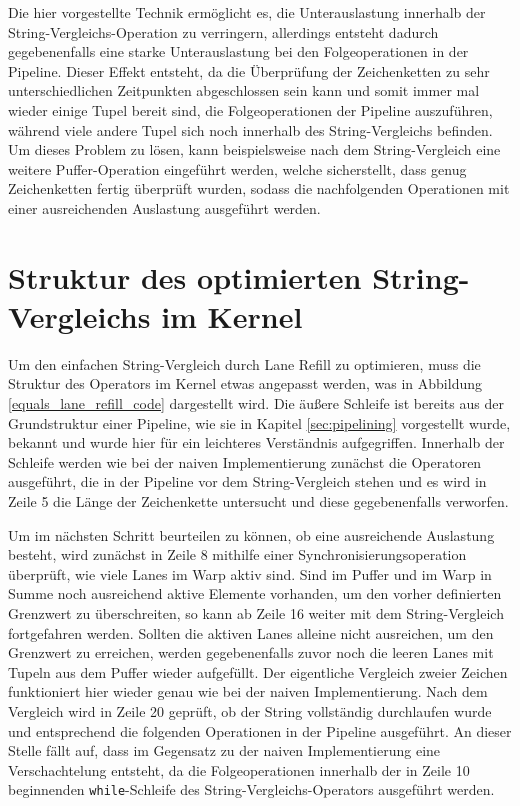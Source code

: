 Die hier vorgestellte Technik ermöglicht es, die Unterauslastung innerhalb der String-Vergleichs-Operation zu verringern, allerdings entsteht dadurch gegebenenfalls eine starke Unterauslastung bei den Folgeoperationen in der Pipeline.
Dieser Effekt entsteht, da die Überprüfung der Zeichenketten zu sehr unterschiedlichen Zeitpunkten abgeschlossen sein kann und somit immer mal wieder einige Tupel bereit sind, die Folgeoperationen der Pipeline auszuführen, während viele andere Tupel sich noch innerhalb des String-Vergleichs befinden.
Um dieses Problem zu lösen, kann beispielsweise nach dem String-Vergleich eine weitere Puffer-Operation eingeführt werden, welche sicherstellt, dass genug Zeichenketten fertig überprüft wurden, sodass die nachfolgenden Operationen mit einer ausreichenden Auslastung ausgeführt werden.

\section{Struktur des optimierten String-Vergleichs im Kernel}

Um den einfachen String-Vergleich durch Lane Refill zu optimieren, muss die Struktur des Operators im Kernel etwas angepasst werden, was in Abbildung \ref{equals_lane_refill_code} dargestellt wird.
Die äußere Schleife ist bereits aus der Grundstruktur einer Pipeline, wie sie in Kapitel \ref{sec:pipelining} vorgestellt wurde, bekannt und wurde hier für ein leichteres Verständnis aufgegriffen.
Innerhalb der Schleife werden wie bei der naiven Implementierung zunächst die Operatoren ausgeführt, die in der Pipeline vor dem String-Vergleich stehen und es wird in Zeile 5 die Länge der Zeichenkette untersucht und diese gegebenenfalls verworfen.

Um im nächsten Schritt beurteilen zu können, ob eine ausreichende Auslastung besteht, wird zunächst in Zeile 8 mithilfe einer Synchronisierungsoperation überprüft, wie viele Lanes im Warp aktiv sind.
Sind im Puffer und im Warp in Summe noch ausreichend aktive Elemente vorhanden, um den vorher definierten Grenzwert zu überschreiten, so kann ab Zeile 16 weiter mit dem String-Vergleich fortgefahren werden.
Sollten die aktiven Lanes alleine nicht ausreichen, um den Grenzwert zu erreichen, werden gegebenenfalls zuvor noch die leeren Lanes mit Tupeln aus dem Puffer wieder aufgefüllt.
Der eigentliche Vergleich zweier Zeichen funktioniert hier wieder genau wie bei der naiven Implementierung.
Nach dem Vergleich wird in Zeile 20 geprüft, ob der String vollständig durchlaufen wurde und entsprechend die folgenden Operationen in der Pipeline ausgeführt.
An dieser Stelle fällt auf, dass im Gegensatz zu der naiven Implementierung eine Verschachtelung entsteht, da die Folgeoperationen innerhalb der in Zeile 10 beginnenden \texttt{while}-Schleife des String-Vergleichs-Operators ausgeführt werden.

